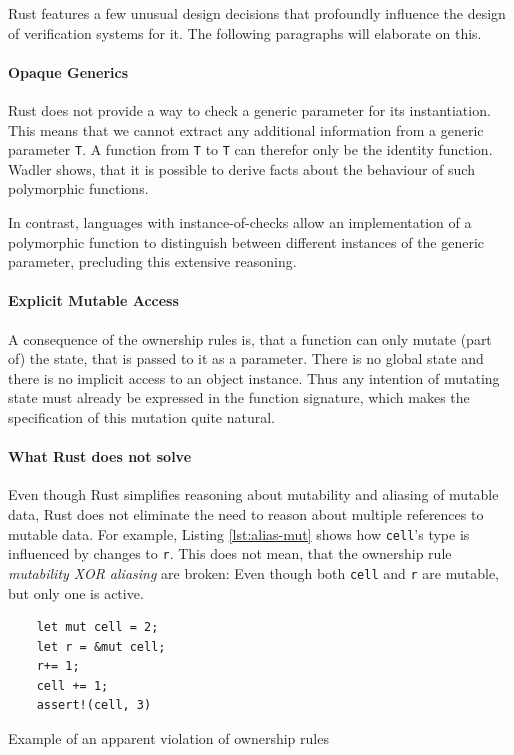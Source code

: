 \documentclass{book}
\newcommand{\code}[1]{\texttt{#1}}
\theoremstyle{definition}
\begin{document}
Rust features a few unusual design decisions that profoundly influence the design of verification systems for it. The following paragraphs will elaborate on this.


\paragraph*{Opaque Generics} Rust does not provide a way to check a generic parameter for its instantiation. This means that we cannot extract any additional information from a generic parameter \code{T}. A function from \code{T} to \code{T} can therefor only be the identity function.
Wadler \cite{wadler_theorems_1989} shows, that it is possible to derive facts about the behaviour of such polymorphic functions.

In contrast, languages with instance-of-checks allow an implementation of a polymorphic function to distinguish between different instances of the generic parameter, precluding this extensive reasoning.

\paragraph*{Explicit Mutable Access} A consequence of the ownership rules is, that a function can only mutate (part of) the state, that is passed to it as a parameter. There is no global state and there is no implicit access to an object instance. Thus any intention of mutating state must already be expressed in the function signature, which makes the specification of this mutation quite natural.

\paragraph*{What Rust does not solve} Even though Rust simplifies reasoning about mutability and aliasing of mutable data, Rust does not eliminate the need to reason about multiple references to mutable data. For example, Listing \ref{lst:alias-mut} shows how \code{cell}'s type is influenced by changes to \code{r}. This does not mean, that the ownership rule  \textit{mutability XOR aliasing} are broken: Even though both \code{cell} and \code{r} are mutable, but only one is active.

\begin{listing}[h]
  \begin{verbatim}
    let mut cell = 2;
    let r = &mut cell;
    r+= 1;
    cell += 1;
    assert!(cell, 3)
  \end{verbatim}
  \caption{Example of an apparent violation of ownership rules}
  \label{lst:alias-mut}
\end{listing}
\end{document}
